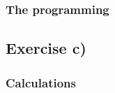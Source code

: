 \documentclass{article}
\begin{document}
\begin{multicols}{2}
\iffalse
    \begin{equation*} \label{eq:fullmatrixeqbackward}
      \begin{bmatrix}
        d_1 & c_1 & 0 & 0 & \dots & 0 \\
        0 & \tilde{d}_2 & c_2 & 0 & \dots & 0 \\
        0 & 0 & \tilde{d}_3 & c_3 & \dots & 0 \\
        \vdots & \vdots & \vdots & \vdots & \ddots & \vdots \\
        0 & 0 & 0 & 0 & \tilde{d}_{n-1} & c_{n-1} \\
        0 & 0 & 0 & 0 & 0 & \tilde{d}_n \\
      \end{bmatrix}
      \begin{bmatrix}
        v_1 \\
        v_2 \\
        v_3 \\
        \vdots \\
        v_{n-1} \\
        v_n \\
      \end{bmatrix}
      =
      \begin{bmatrix}
        \tilde{b}_1 \\
        \tilde{b}_2 \\
        \tilde{b}_3 \\
        \vdots \\
        \tilde{b}_{n-1} \\
        \tilde{b}_n \\
      \end{bmatrix}
    \end{equation*} \\
\fi


  \subsubsection{The programming}




\subsection{Exercise c)} \label{sec:Method c)}

  \subsubsection{Calculations}





\end{multicols}
\end{document}
